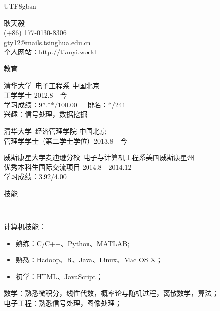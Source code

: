 \documentclass[9pt]{article}
\newenvironment{changemargin}[2]{%
  \begin{list}{}{%
    \setlength{\topsep}{0pt}%
    \setlength{\leftmargin}{#1}%
    \setlength{\rightmargin}{#2}%
    \setlength{\listparindent}{\parindent}%
    \setlength{\itemindent}{\parindent}%
    \setlength{\parsep}{\parskip}%
  }%
  \item[]}{\end{list}
}
\newcommand{\lineover}{
    \begin{changemargin}{-0.05in}{-0.05in}
        \vspace*{-8pt}
        \hrulefill \\
        \vspace*{-2pt}
    \end{changemargin}
}
\newcommand{\header}[1]{
    \begin{changemargin}{-0.5in}{-0.5in}
        \scshape{#1}\\
    \lineover
    \end{changemargin}
}
\newcommand{\contact}[5]{
    \begin{changemargin}{-0.5in}{-0.5in}
        \begin{center}
            {\Large \scshape {#1}}\\ \smallskip
            {#2}\\ \smallskip 
            {#3}\\ \smallskip
            {#4}\\ \smallskip
            {#5}\smallskip
        \end{center}
    \end{changemargin}
}
\newenvironment{body} {
    \vspace*{-16pt}
    \begin{changemargin}{-0.25in}{-0.5in}
  } 
    {\end{changemargin}
}
\begin{document}
\begin{CJK*}{UTF8}{gbsn}

\contact{耿天毅}{(+86) 177-0130-8306}{gty12@mails.tsinghua.edu.cn}{\href{http://tianyi.world}{个人网站：http://tianyi.world}}

\header{教育}

\begin{body}
    \vspace{14pt}

    清华大学\ 电子工程系 \hfill 中国北京 \\
工学学士 \hfill 2012.8 - 今 \\
学习成绩：9*.**/100.00\ \ \ 排名：*/241\\
兴趣：信号处理，数据挖掘 \\
\vspace{6pt}

    清华大学\ 经济管理学院 \hfill 中国北京 \\
管理学学士（第二学士学位）\hfill 2013.8 - 今 \\
\vspace{6pt}

    威斯康星大学麦迪逊分校\ 电子与计算机工程系\hfill 美国威斯康星州 \\
优秀本科生国际交流项目 \hfill 2014.8 - 2014.12 \\
学习成绩：3.92/4.00

\end{body}

\smallskip
\smallskip
\smallskip

\header{技能}

\begin{body}
    \vspace{14pt}
    计算机技能：
    \begin{itemize}
    \itemsep 0pt
    \item 熟练：C/C++、Python、MATLAB;
    \item 熟悉：Hadoop、R、Java、Linux、Mac OS X；
    \item 初学：HTML、JavaScript；
    \end{itemize}

    \smallskip
    数学：熟悉微积分，线性代数，概率论与随机过程，离散数学，算法；\\
    \smallskip
    电子工程：熟悉信号处理，图像处理；\\
    \smallskip
    


\end{body}
\end{CJK*}
\end{document}
